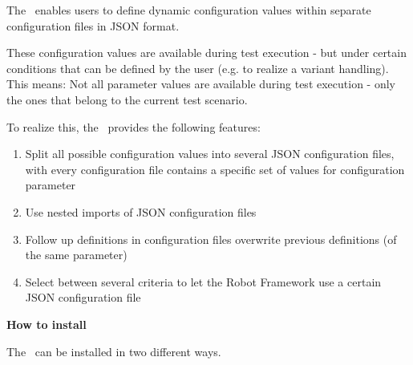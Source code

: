 %



%

The \pkg\ enables users to define dynamic configuration values within separate configuration files in JSON format.

These configuration values are available during test execution - but under certain conditions that can be defined by the user
(e.g. to realize a variant handling). This means: Not all parameter values are available during test execution - only the ones
that belong to the current test scenario.

To realize this, the \pkg\ provides the following features:

\begin{enumerate}
   \item Split all possible configuration values into several JSON configuration files, with every configuration file contains a specific
         set of values for configuration parameter
   \item Use nested imports of JSON configuration files
   \item Follow up definitions in configuration files overwrite previous definitions (of the same parameter)
   \item Select between several criteria to let the Robot Framework use a certain JSON configuration file
\end{enumerate}

\vspace{2ex}

\textbf{How to install}

\vspace{2ex}

The \pkg\ can be installed in two different ways.

